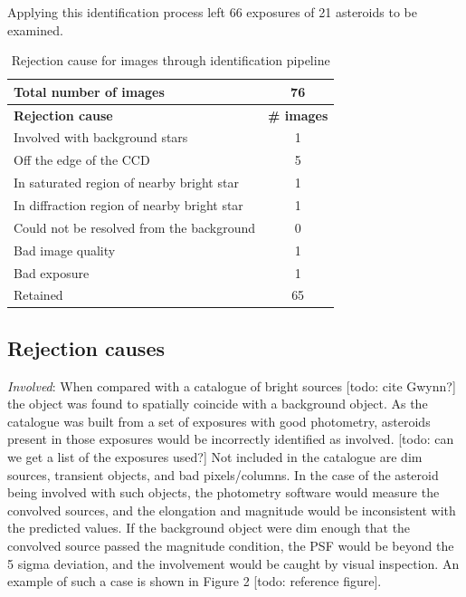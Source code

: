 \documentclass[iop,apj]{emulateapj}
\begin{document}

Applying this identification process left 66 exposures of 21 asteroids to be examined.

\begin{table}[htdp]
\caption{Rejection cause for images through identification pipeline}
\begin{center}
\begin{tabular}{lc}
	Total number of images							&	76 			\\
	\hline
	\textbf{Rejection cause}						& 	\textbf{\# images} \\
	\hline
	Involved with background stars                          & 	1			\\
	Off the edge of the CCD						& 	5			\\
	In saturated region of nearby bright star			& 	1			\\
	In diffraction region of nearby bright star		&	1			\\
	Could not be resolved from the background 	&	0			\\
	Bad image quality								&	1			\\
	Bad exposure									& 	1			\\
	\hline
	Retained										&	65
\end{tabular}
\end{center}
\label{default}
\end{table}

\subsection{Rejection causes}

\textit{Involved}:
When compared with a catalogue of bright sources [todo: cite Gwynn?] the object was found to spatially coincide with a background object. As the catalogue was built from a set of exposures with good photometry, asteroids present in those exposures would be incorrectly identified as involved. [todo: can we get a list of the exposures used?] Not included in the catalogue are dim sources, transient objects, and bad pixels/columns. In the case of the asteroid being involved with such objects, the photometry software would measure the convolved sources, and the elongation and magnitude would be inconsistent with the predicted values. If the background object were dim enough that the convolved source passed the magnitude condition, the PSF would be beyond the 5 sigma deviation, and the involvement would be caught by visual inspection. An example of such a case is shown in Figure 2 [todo: reference figure].
\end{document}
